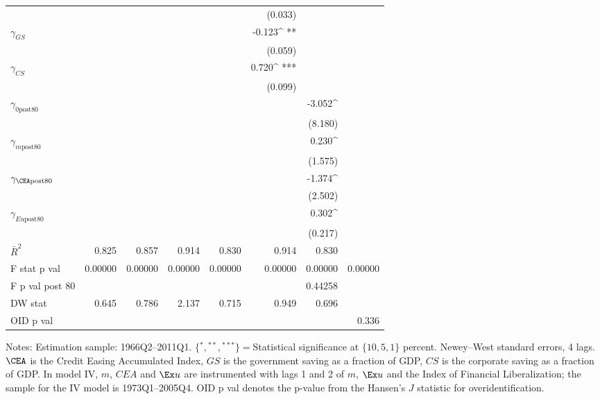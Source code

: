 \begin{table}
\begin{center}
\begin{tabular}{@{}ld{6}d{6}d{6}d{6}d{6}d{6}d{6}@{}}
 &   &  & & & (0.033)  & & \\
 $\gamma_{GS}$  &   & & & & -0.123^{ **}  & & \\
 &   &  & & & (0.059)  &  & \\
 $\gamma_{CS}$  &   & & & &0.720^{ ***}  & & \\
 &   &  & & & (0.099)  & & \\
 $\gamma_{\text{0post80}}$  &   & & & & &-3.052^{ }  &  \\
 &   &  & & & & (8.180)   & \\
 $\gamma_{m\text{post80}}$  &   & & & & &0.230^{ }  &  \\
 &   &  & &  & &(1.575)  &  \\
 $\gamma_{\CEA\text{post80}}$  &   & & & & &-1.374^{ }  & \\
 &   &  & & & &(2.502)  & \\
 $\gamma_{Eu\text{post80}}$  &   & & & & &0.302^{ }  &  \\
 &   &  & &  & & (0.217)  &  \\
\midrule
 $\bar{R}^2$  & 0.825  & 0.857  & 0.914  & 0.830  & 0.914  & 0.830  & \\
 F stat p val  & 0.00000  & 0.00000  & 0.00000  & 0.00000  & 0.00000  & 0.00000  & 0.00000\\
 F p val post 80 &  & & & & & 0.44258  &  \\
DW stat  & 0.645  & 0.786  & 2.137  & 0.715  & 0.949  & 0.696 & \\
OID p val &  & & & &  & & 0.336\\
\bottomrule
\end{tabular}
\end{center}
 {\footnotesize Notes: Estimation sample: 1966Q2--2011Q1. $\{{}^*,{}^{**},{}^{***}\}={}$Statistical significance at $\{10,5,1\}$ percent. Newey--West standard errors, 4 lags. $\CEA$ is the Credit Easing Accumulated Index, $GS$ is the government saving as a fraction of GDP, $CS$ is the corporate saving as a fraction of GDP. In model IV, $m$, $CEA$ and $\Ex u$ are instrumented with lags 1 and 2 of $m$, $\Ex u$ and the \cite{abiadEtAl_FinReforms} Index of Financial Liberalization; the sample for the IV model is 1973Q1--2005Q4. OID p val denotes the p-value from the Hansen's $J$ statistic for overidentification.}
\end{table}
